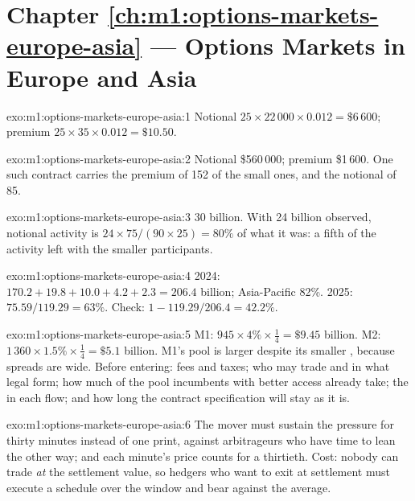 \section*{Chapter \ref{ch:m1:options-markets-europe-asia} --- Options Markets in Europe and Asia}

\begin{solution}{exo:m1:options-markets-europe-asia:1}
Notional $25 \times 22\,000 \times 0.012 = \$6\,600$; premium $25 \times 35 \times
0.012 = \$10.50$.
\end{solution}

\begin{solution}{exo:m1:options-markets-europe-asia:2}
Notional \$560\,000; premium \$1\,600. One such contract carries the premium
of 152 of the small ones, and the notional of 85.
\end{solution}

\begin{solution}{exo:m1:options-markets-europe-asia:3}
30 billion. With 24 billion observed, notional activity is $24 \times 75/(90
\times 25) = 80\%$ of what it was: a fifth of the activity left with the
smaller participants.
\end{solution}

\begin{solution}{exo:m1:options-markets-europe-asia:4}
2024: $170.2 + 19.8 + 10.0 + 4.2 + 2.3 = 206.4$ billion; Asia-Pacific 82\%.
2025: $75.59/119.29 = 63\%$. Check: $1 - 119.29/206.4 = 42.2\%$.
\end{solution}

\begin{solution}{exo:m1:options-markets-europe-asia:5}
M1: $945 \times 4\% \times \tfrac14 = \$9.45$ billion. M2: $1\,360 \times 1.5\%
\times \tfrac14 = \$5.1$ billion. M1's pool is larger despite its smaller
, because spreads are wide. Before entering: fees and taxes;
who may trade and in what legal form; how much of the pool incumbents with
better access already take; the  in each flow; and how
long the contract specification will stay as it is.
\end{solution}

\begin{solution}{exo:m1:options-markets-europe-asia:6}
The mover must sustain the pressure for thirty minutes instead of one print,
against arbitrageurs who have time to lean the other way; and each minute's
price counts for a thirtieth. Cost: nobody can trade \emph{at} the
settlement value, so hedgers who want to exit at settlement must execute a
schedule over the window and bear  against the average.
\end{solution}

